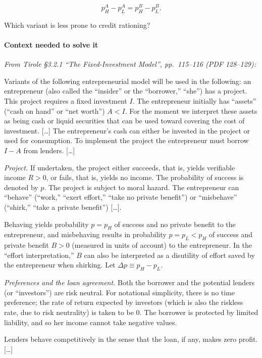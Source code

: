 \documentclass[11pt,a4paper]{article}
\begin{document}
\[p_H^A - p_L^A = p_H^B - p_L^B.\]

Which variant is less prone to credit rationing?

\paragraph{Context needed to solve it}

\emph{From Tirole §3.2.1 ``The Fixed-Investment Model'', pp.~115--116 (PDF 128--129):}

Variants of the following entrepreneurial model will be used in the following: an entrepreneur (also
called the ``insider'' or the ``borrower,'' ``she'') has a project. This project requires a fixed
investment \(I\). The entrepreneur initially has ``assets'' (``cash on hand'' or ``net worth'')
\(A < I\). For the moment we interpret these assets as being cash or liquid securities that can be
used toward covering the cost of investment. {[}\ldots{]} The entrepreneur's cash can either be
invested in the project or used for consumption. To implement the project the entrepreneur must
borrow \(I - A\) from lenders. {[}\ldots{]}

\emph{Project.} If undertaken, the project either succeeds, that is, yields verifiable income
\(R > 0\), or fails, that is, yields no income. The probability of success is denoted by \(p\). The
project is subject to moral hazard. The entrepreneur can ``behave'' (``work,'' ``exert effort,''
``take no private benefit'') or ``misbehave'' (``shirk,'' ``take a private benefit'') {[}\ldots{]}.

Behaving yields probability \(p = p_H\) of success and no private benefit to the entrepreneur, and
misbehaving results in probability \(p = p_L < p_H\) of success and private benefit \(B > 0\)
(measured in units of account) to the entrepreneur. In the ``effort interpretation,'' \(B\) can also
be interpreted as a disutility of effort saved by the entrepreneur when shirking. Let
\(\Delta p \equiv p_H - p_L\).

\emph{Preferences and the loan agreement.} Both the borrower and the potential lenders (or
``investors'') are risk neutral. For notational simplicity, there is no time preference; the rate of
return expected by investors (which is also the riskless rate, due to risk neutrality) is taken to
be 0. The borrower is protected by limited liability, and so her income cannot take negative values.

Lenders behave competitively in the sense that the loan, if any, makes zero profit. {[}\ldots{]}
\end{document}
